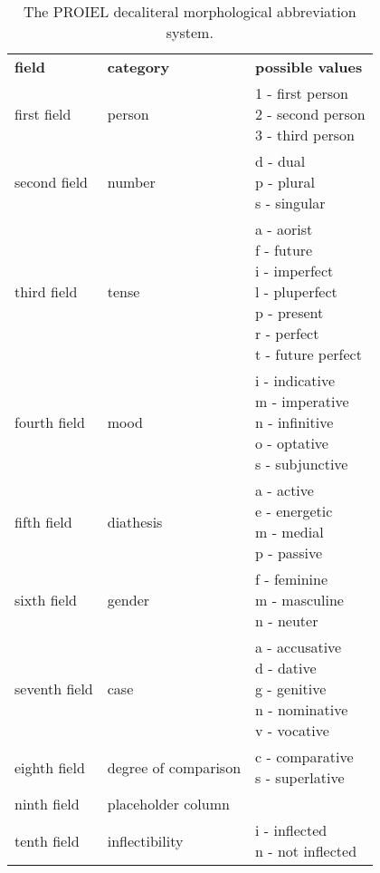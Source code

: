 \begin{table}
  \begin{tabular}{|l|l|l|}
        \hline
        \textbf{field}            & \textbf{category} & \textbf{possible values} \\ \thickhline
            first field & person & \specialcell{1 - first person\\2 - second person\\3 - third person} \\ \hline
            second field  & number & \specialcell{d - dual\\p - plural\\s - singular} \\ \hline
            third field & tense & \specialcell{a - aorist\\f - future\\i - imperfect\\l - pluperfect\\p - present\\r - perfect\\t - future perfect} \\ \hline
             fourth field & mood & \specialcell{i - indicative\\m - imperative\\n - infinitive\\o - optative\\s - subjunctive} \\ \hline
             fifth field & diathesis & \specialcell{a - active\\e - energetic\\m - medial\\p - passive} \\ \hline
           sixth field & gender & \specialcell{f - feminine\\m - masculine\\n - neuter} \\ \hline
            seventh field & case & \specialcell{a - accusative\\d - dative\\g - genitive\\n - nominative\\v - vocative} \\ \hline
             eighth field & degree of comparison & \specialcell{c - comparative\\s - superlative} \\ \hline
             ninth field & placeholder column & \specialcell{-} \\ \hline
             tenth field & inflectibility & \specialcell{i - inflected\\n - not inflected} \\ \hline
        \hline
    \end{tabular}
\caption{The PROIEL decaliteral morphological abbreviation system.} \label{table:proielmorph}
\end{table}

